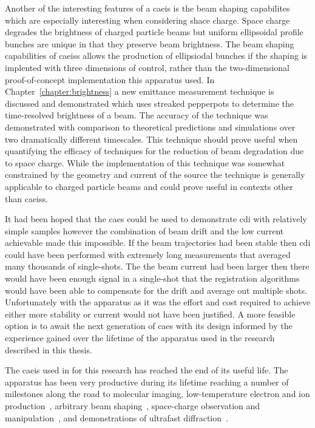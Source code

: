 Another of the interesting features of a \gls{caeis} is the beam shaping capabilites which are especially interesting when considering shace charge.
Space charge degrades the brightness of charged particle beams but uniform ellipsoidal profile bunches are unique in that they preserve beam brightness.
The beam shaping capabilities of \glspl{caeis} allows the production of ellipsiodal bunches if the shaping is implented with three dimensions of control, rather than the two-dimensional proof-of-concept implementation this apparatus used.
In Chapter~\ref{chapter:brightness} a new emittance measurement technique is discussed and demonstrated which uses streaked pepperpots to determine the time-resolved brightness of a beam.
The accuracy of the technique was demonstrated with comparison to theoretical predictions and simulations over two dramatically different timescales.
This technique should prove useful when quantifying the efficacy of techniques for the reduction of beam degradation due to space charge.
While the implementation of this technique was somewhat constrained by the geometry and current of the source the technique is generally applicable to charged particle beams and could prove useful in contexts other than \glspl{caeis}.

It had been hoped that the \gls{caes} could be used to demonstrate \gls{cdi} with relatively simple samples however the combination of beam drift and the low current achievable made this impossible.
If the beam trajectories had been stable then \gls{cdi} could have been performed with extremely long measurements that averaged many thousands of single-shots.
The the beam current had been larger then there would have been enough signal in a single-shot that the registration algorithms would have been able to compensate for the drift and average out multiple shots.
Unfortunately with the apparatus as it was the effort and cost required to achieve either more stability or current would not have been justified.
A more feasible option is to await the next generation of \gls{caes} with its design informed by the experience gained over the lifetime of the apparatus used in the research described in this thesis.

The \gls{caeis} used in for this research has reached the end of its useful life.
The apparatus has been very productive during its lifetime reaching a number of milestones along the road to molecular imaging, low-temperature electron and ion production~\cite{saliba_spatial_2012,mcculloch_high-coherence_2013,mcculloch_field_2017,speirs_identification_2017}, arbitrary beam shaping~\cite{mcculloch_arbitrarily_2011}, space-charge observation and manipulation~\cite{murphy_detailed_2014,murphy_increasing_2015,thompson_suppression_2016}, and demonstrations of ultrafast diffraction~\cite{speirs_single-shot_2015}.

